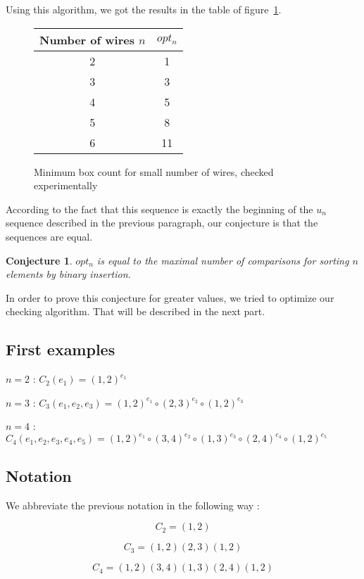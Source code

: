 \documentclass[11pt, a4paper]{article}
\newtheorem*{Conj*}{Conjecture}
\begin{document}
Using this algorithm, we got the results in the table of figure~\ref{box-count}.

\begin{figure}
    \centering
    \begin{tabular}{|c|c|}
    \hline
    Number of wires $n$ & $opt_n$ \\
    \hline
    2 & 1 \\
    3 & 3 \\
    4 & 5 \\
    5 & 8 \\
    6 & 11 \\
    \hline
    \end{tabular}
    \caption{Minimum box count for small number of wires, checked experimentally}
    \label{box-count}
\end{figure}

According to the fact that this sequence is exactly the beginning of the $u_n$
sequence described in the previous paragraph, our conjecture is that the
sequences are equal.

\begin{Conj*}
$opt_n$ is equal to the maximal number of comparisons for sorting $n$ elements
by binary insertion.
\end{Conj*}


In order to prove this conjecture for greater values, we tried to optimize our
checking algorithm. That will be described in the next part.

\subsection{First examples}

$n=2$ : $C_2(e_1) = (1,2)^{e_1}$

$n=3$ : $C_3(e_1,e_2,e_3) = (1,2)^{e_1} \circ (2,3)^{e_2} \circ (1,2)^{e_3}$

$n=4$ : $C_4(e_1,e_2,e_3,e_4,e_5) = (1, 2)^{e_1} \circ (3,4)^{e_2} \circ
(1,3)^{e_3} \circ (2, 4)^{e_4} \circ (1,2)^{e_5}$

\subsection {Notation}

We abbreviate the previous notation in the following way :

$$C_2 = (1,2)$$

$$C_3 = (1,2)(2,3)(1,2)$$

$$C_4 = (1,2)(3,4)(1,3)(2,4)(1,2)$$
\end{document}
